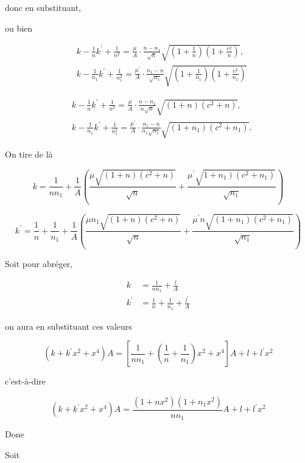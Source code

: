 \documentclass{article}
\begin{document}
donc en substituant,

ou bien

\[
\begin{aligned}
& k-\frac{1}{n} k^{\prime}+\frac{1}{n^{2}}=\frac{\mu}{A} \cdot \frac{n-n_{1}}{\sqrt{n}} \sqrt{\left(1+\frac{1}{n}\right)\left(1+\frac{c^{2}}{n}\right)}, \\
& k-\frac{1}{n_{1}} k^{\prime}+\frac{1}{n_{1}^{2}}=\frac{\mu^{\prime}}{A} \cdot \frac{n_{1}-n}{\sqrt{n_{1}}} \sqrt{\left(1+\frac{1}{n_{1}}\right)\left(1+\frac{c^{2}}{n_{1}}\right)}
\end{aligned}
\]

\[
\begin{aligned}
& k-\frac{1}{n} k^{\prime}+\frac{1}{n^{2}}=\frac{\mu}{A} \cdot \frac{n-n_{1}}{n \sqrt{n}} \sqrt{(1+n)\left(c^{2}+n\right)}, \\
& k-\frac{1}{n_{1}} k^{\prime}+\frac{1}{n_{1}^{2}}=\frac{\mu^{\prime}}{A} \cdot \frac{n_{1}-n}{n_{1} \sqrt{n_{1}}} \sqrt{\left(1+n_{1}\right)\left(c^{2}+n_{1}\right)} .
\end{aligned}
\]

On tire de là

\[
k=\frac{1}{n n_{1}}+\frac{1}{A}\left(\frac{\mu \sqrt{(1+n)\left(c^{2}+n\right)}}{\sqrt{n}}+\frac{\mu^{\prime} \sqrt{\left.1+n_{1}\right)\left(c^{2}+n_{1}\right)}}{\sqrt{n_{1}}}\right)
\]

\[
k^{\prime}=\frac{1}{n}+\frac{1}{n_{1}}+\frac{1}{A}\left(\frac{\mu n_{1} \sqrt{(1+n)\left(c^{2}+n\right)}}{\sqrt{n}}+\frac{\mu^{\prime} n \sqrt{\left(1+n_{1}\right)\left(c^{2}+n_{1}\right)}}{\sqrt{n_{1}}}\right)
\]

Soit pour abréger,

\[
\begin{aligned}
k & =\frac{1}{n n_{1}}+\frac{l}{A} \\
k^{\prime} & =\frac{1}{n}+\frac{1}{n_{1}}+\frac{l^{\prime}}{A}
\end{aligned}
\]

on aura en substituant ces valeurs

\[
\left(k+k^{\prime} x^{2}+x^{4}\right) A=\left[\frac{1}{n n_{1}}+\left(\frac{1}{n}+\frac{1}{n_{1}}\right) x^{2}+x^{4}\right] A+l+l^{\prime} x^{2}
\]

c'est-à-dire

\[
\left(k+k^{\prime} x^{2}+x^{4}\right) A=\frac{\left(1+n x^{2}\right)\left(1+n_{1} x^{2}\right)}{n n_{1}} A+l+l^{\prime} x^{2}
\]

Done

Soit
\end{document}
